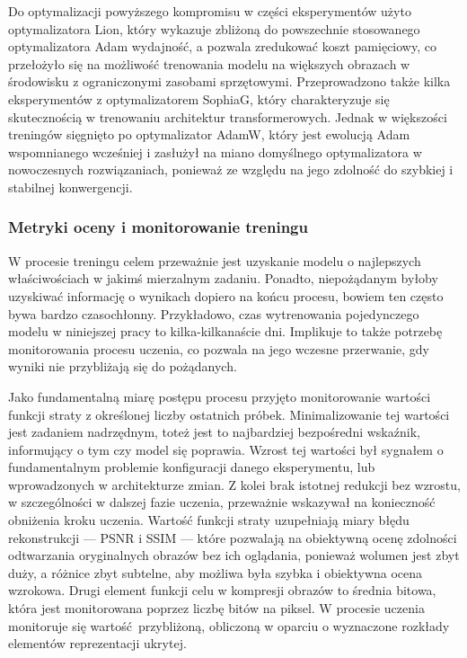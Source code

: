 Do optymalizacji powyższego kompromisu w części eksperymentów użyto optymalizatora Lion, który wykazuje zbliżoną do powszechnie stosowanego optymalizatora Adam wydajność, a pozwala zredukować koszt pamięciowy\cite{chen2023symbolicdiscoveryoptimizationalgorithms}, co przełożyło się na możliwość trenowania modelu na większych obrazach w środowisku z ograniczonymi zasobami sprzętowymi. Przeprowadzono także kilka eksperymentów z optymalizatorem SophiaG, który charakteryzuje się skutecznością w trenowaniu architektur transformerowych\cite{liu2024sophiascalablestochasticsecondorder}. Jednak w większości treningów sięgnięto po optymalizator AdamW, który jest ewolucją Adam wspomnianego wcześniej i zasłużył na miano domyślnego optymalizatora w nowoczesnych rozwiązaniach, ponieważ ze względu na jego zdolność do szybkiej i stabilnej konwergencji\cite{cornell_opt_wiki_adamw}.

\subsubsection{Metryki oceny i monitorowanie treningu}
\begin{sloppypar}
W procesie treningu celem przeważnie jest uzyskanie modelu o najlepszych właściwościach w jakimś mierzalnym zadaniu. Ponadto, niepożądanym byłoby uzyskiwać informację o wynikach dopiero na końcu procesu, bowiem ten często bywa bardzo czasochłonny. Przykładowo, czas wytrenowania pojedynczego modelu w niniejszej pracy to kilka-kilkanaście dni. Implikuje to także potrzebę monitorowania procesu uczenia, co pozwala na jego wczesne przerwanie, gdy wyniki nie przybliżają się do pożądanych.
\end{sloppypar}

Jako fundamentalną miarę postępu procesu przyjęto monitorowanie wartości funkcji straty z określonej liczby ostatnich próbek. Minimalizowanie tej wartości jest zadaniem nadrzędnym, toteż jest to najbardziej bezpośredni wskaźnik, informujący o tym czy model się poprawia. Wzrost tej wartości był sygnałem o fundamentalnym problemie konfiguracji danego eksperymentu, lub wprowadzonych w architekturze zmian. Z kolei brak istotnej redukcji bez wzrostu, w szczególności w dalszej fazie uczenia, przeważnie wskazywał na konieczność obniżenia kroku uczenia. Wartość funkcji straty uzupełniają miary błędu rekonstrukcji --- PSNR i SSIM --- które pozwalają na obiektywną ocenę zdolności odtwarzania oryginalnych obrazów bez ich oglądania, ponieważ wolumen jest zbyt duży, a różnice zbyt subtelne, aby możliwa była szybka i obiektywna ocena wzrokowa. Drugi element funkcji celu w kompresji obrazów to średnia bitowa, która jest monitorowana poprzez liczbę bitów na piksel. W procesie uczenia monitoruje się wartość przybliżoną, obliczoną w oparciu o wyznaczone rozkłady elementów reprezentacji ukrytej.

